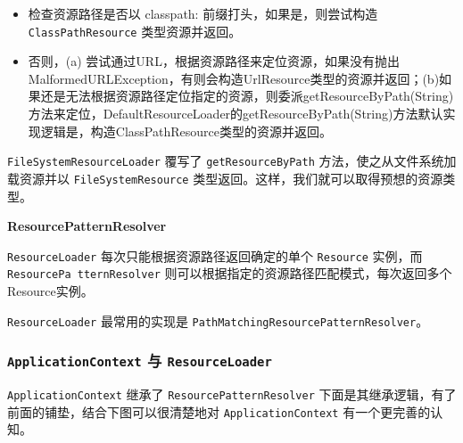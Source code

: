 \begin{itemize}
    \item 检查资源路径是否以 classpath: 前缀打头，如果是，则尝试构造\texttt{ClassPathResource} 类型资源并返回。
    \item 否则，(a) 尝试通过URL，根据资源路径来定位资源，如果没有抛出MalformedURLException，有则会构造UrlResource类型的资源并返回；(b)如果还是无法根据资源路径定位指定的资源，则委派getResourceByPath(String)方法来定位，DefaultResourceLoader的getResourceByPath(String)方法默认实现逻辑是，构造ClassPathResource类型的资源并返回。
\end{itemize}

\texttt{FileSystemResourceLoader} 覆写了 \texttt{getResourceByPath} 方法，使之从文件系统加载资源并以 \texttt{FileSystemResource} 类型返回。这样，我们就可以取得预想的资源类型。

\noindent\textbf{ResourcePatternResolver}

\texttt{ResourceLoader} 每次只能根据资源路径返回确定的单个 \texttt{Resource} 实例，而 \texttt{ResourcePa tternResolver} 则可以根据指定的资源路径匹配模式，每次返回多个Resource实例。

\texttt{ResourceLoader} 最常用的实现是 \texttt{PathMatchingResourcePatternResolver}。

\subsubsection{\texttt{ApplicationContext} 与 \texttt{ResourceLoader}}

\texttt{ApplicationContext} 继承了 \texttt{ResourcePatternResolver} 下面是其继承逻辑，有了前面的铺垫，结合下图可以很清楚地对 \texttt{ApplicationContext} 有一个更完善的认知。

